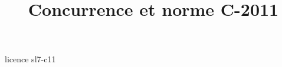 \documentclass [xcolor=table] {beamer}
\title {Concurrence et norme C-2011}
\begin{document}
 {licence}
 {sl7-c11}
\end{document}
